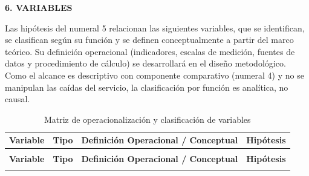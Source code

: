 \hypertarget{sec:variables}{}%
\begin{center}
    {\Large\bfseries 6. VARIABLES}
\end{center}
\vspace{1em}

Las hipótesis del numeral 5 relacionan las siguientes variables, que se identifican, se clasifican según su función y se definen conceptualmente a partir del marco teórico. Su definición operacional (indicadores, escalas de medición, fuentes de datos y procedimiento de cálculo) se desarrollará en el diseño metodológico. Como el alcance es descriptivo con componente comparativo (numeral 4) y no se manipulan las caídas del servicio, la clasificación por función es analítica, no causal.

\begingroup
\small
\begin{longtable}{|p{3.5cm}|p{2.5cm}|p{6.5cm}|p{1.5cm}|}
\caption{Matriz de operacionalización y clasificación de variables} \label{tab:matriz_variables} \\
\hline
\textbf{Variable} & \textbf{Tipo} & \textbf{Definición Operacional / Conceptual} & \textbf{Hipótesis} \\ \hline
\endfirsthead

\multicolumn{4}{c}{{\thetable{} }} \\
\hline
\textbf{Variable} & \textbf{Tipo} & \textbf{Definición Operacional / Conceptual} & \textbf{Hipótesis} \\ \hline
\endhead



\hline
\endlastfoot


\end{longtable}

